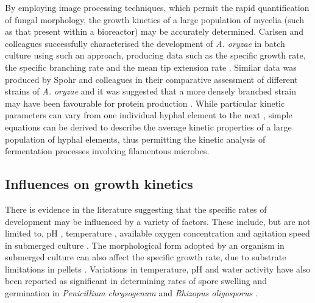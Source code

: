By employing image processing techniques, which permit the rapid quantification of fungal morphology, the growth kinetics of a large population of mycelia (such as that present within a bioreactor) may be accurately determined. Carlsen and colleagues successfully characterised the development of \emph{A. oryzae} in batch culture using such an approach, producing data such as the specific growth rate, the specific branching rate and the mean tip extension rate \cite{carlsen1996a}. Similar data was produced by Spohr and colleagues in their comparative assessment of different strains of \emph{A. oryzae} and it was suggested that a more densely branched strain may have been favourable for protein production \cite{spohr1997}. While particular kinetic parameters can vary from one individual hyphal element to the next \cite{spohr1998, christiansen1999, dieguez-uribeondo2005}, simple equations can be derived to describe the average kinetic properties of a large population of hyphal elements, thus permitting the kinetic analysis of fermentation processes involving filamentous microbes.

\subsection{Influences on growth kinetics}

There is evidence in the literature suggesting that the specific rates of development may be influenced by a variety of factors. These include, but are not limited to, pH \cite{carlsen1996a}, temperature \cite{carlsen1996a, cross2004}, available oxygen concentration \cite{rahardjo2005b} and agitation speed in submerged culture \cite{papagianni1999, papagianni2001}. The morphological form adopted by an organism in submerged culture can also affect the specific growth rate, due to substrate limitations in pellets \cite{carlsen1996a}. Variations in temperature, pH and water activity have also been reported as significant in determining rates of spore swelling and germination in \emph{Penicillium chrysogenum} \cite{sautour2001} and \emph{Rhizopus oligosporus} \cite{medwid1984}.

